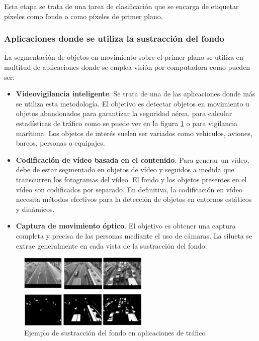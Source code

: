 Esta etapa se trata de una tarea de clasificación que se encarga de etiquetar píxeles como fondo o como píxeles de primer plano.

\subsubsection*{Aplicaciones donde se utiliza la sustracción del fondo}
\label{subsubsec:aplicaciones-background-subtraction}

La segmentación de objetos en movimiento sobre el primer plano se utiliza en multitud de aplicaciones donde se emplea visión por computadora como pueden ser:

\begin{itemize}
    \item \textbf{Videovigilancia inteligente}. Se trata de una de las aplicaciones donde más se utiliza esta metodología. El objetivo es detectar objetos en movimiento u objetos abandonados para garantizar la seguridad aérea, para calcular estadísticas de tráfico como se puede ver en la figura \ref{fig:background-subtraction-example} o para vigilancia marítima. Los objetos de interés suelen ser variados como vehículos, aviones, barcos, personas o equipajes.
    \item \textbf{Codificación de vídeo basada en el contenido}. Para generar un vídeo, debe de estar segmentado en objetos de vídeo y seguidos a medida que transcurren los fotogramas del vídeo. El fondo y los objetos presentes en el vídeo son codificados por separado. En definitiva, la codificación en vídeo necesita métodos efectivos para la detección de objetos en entornos estáticos y dinámicos.
    \item \textbf{Captura de movimiento óptico}. El objetivo es obtener una captura completa y precisa de las personas mediante el uso de cámaras. La silueta se extrae generalmente en cada vista de la sustracción del fondo.
\end{itemize}

\begin{figure}[ht]
\centering
\includegraphics[width=0.55\textwidth]{img/chapters/estado-del-arte/background-subtraction-example.jpg}
\caption{\label{fig:background-subtraction-example}Ejemplo de sustracción del fondo en aplicaciones de tráfico \cite{BOUWMANS201431}}
\end{figure}

